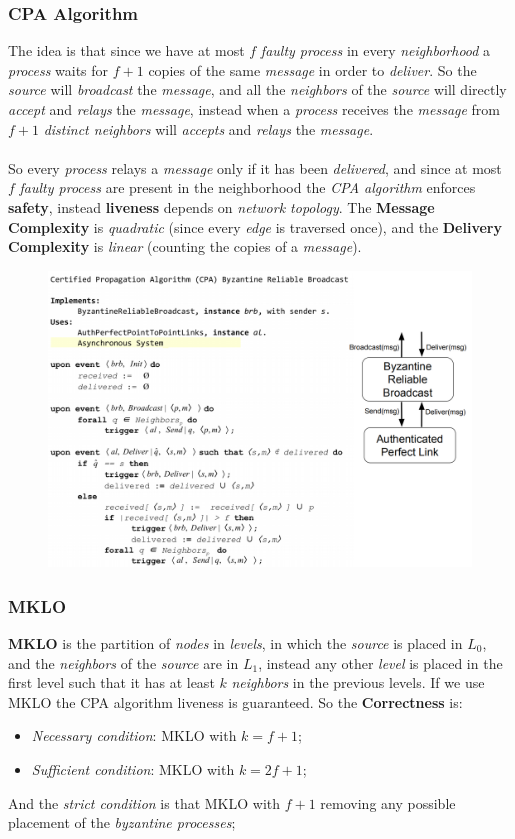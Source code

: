 \documentclass{article}
\begin{document}
\subsubsection{CPA Algorithm}
The idea is that since we have at most $f$ \emph{faulty process} in every \emph{neighborhood} a \emph{process} waits for $f+1$ copies of the same \emph{message} in order to \emph{deliver}. So the \emph{source} will \emph{broadcast} the \emph{message}, and all the \emph{neighbors} of the \emph{source} will directly \emph{accept} and \emph{relays} the \emph{message}, instead when a \emph{process} receives the \emph{message} from $f+1$ \emph{distinct neighbors} will \emph{accepts} and \emph{relays} the \emph{message}. \\\\
So every \emph{process} relays a \emph{message} only if it has been \emph{delivered}, and since at most $f$ \emph{faulty process} are present in the neighborhood the \emph{CPA algorithm} enforces \textbf{safety}, instead \textbf{liveness} depends on \emph{network topology}. The \textbf{Message Complexity} is \emph{quadratic} (since every \emph{edge} is traversed once), and the \textbf{Delivery Complexity} is \emph{linear} (counting the copies of a \emph{message}).
\begin{figure}[H]
  \centering
  \includegraphics[scale=0.65]{cattura97.png}
\end{figure}
\subsubsection{MKLO}
\textbf{MKLO} is the partition of \emph{nodes} in \emph{levels}, in which the \emph{source} is placed in $L_0$, and the \emph{neighbors} of the \emph{source} are in $L_1$, instead any other \emph{level} is placed in the first level such that it has at least $k$ \emph{neighbors} in the previous levels. If we use MKLO the CPA algorithm liveness is guaranteed. So the \textbf{Correctness} is:
\begin{itemize}
\item \emph{Necessary condition}: MKLO with $k=f+1$;
\item \emph{Sufficient condition}: MKLO with $k=2f+1$;
\end{itemize}
And the \emph{strict condition} is that MKLO with $f+1$ removing any possible placement of the \emph{byzantine processes};
\end{document}
